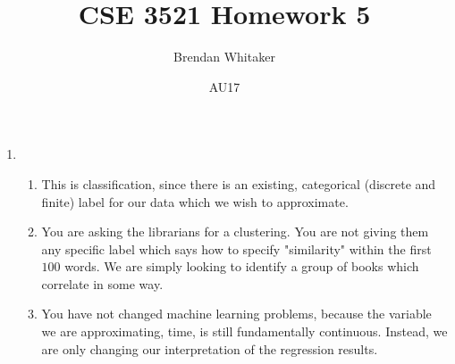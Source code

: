\documentclass[10pt,oneside,reqno]{amsart}
\theoremstyle{plain}
\theoremstyle{definition}
\begin{document}
\title{CSE 3521 Homework 5}

\date{AU17}

\author[Brendan Whitaker]{Brendan Whitaker}

\maketitle

\begin{enumerate}[label=\arabic*.]

\item 

\begin{enumerate}

\item This is classification, since there is an existing, categorical (discrete and finite) label for our data which we wish to approximate. 

\item You are asking the librarians for a clustering. You are not giving them any specific label which says how to specify "similarity" within the first $100$ words. We are simply looking to identify a group of books which correlate in some way. 

\item You have not changed machine learning problems, because the variable we are approximating, time, is still fundamentally continuous. Instead, we are only changing our interpretation of the regression results. 

\end{enumerate}


\end{enumerate}
\end{document}
